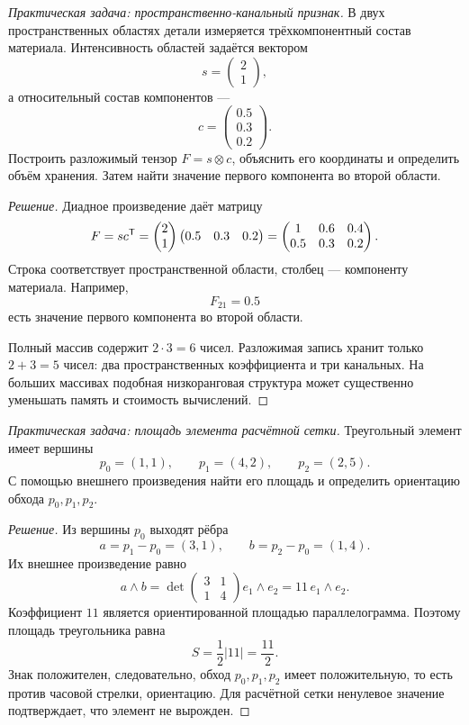 \begin{problem}
\textit{Практическая задача: пространственно-канальный признак.}
В двух пространственных областях детали измеряется трёхкомпонентный состав материала. Интенсивность областей задаётся вектором
\[
s=
\begin{pmatrix}
2\\1
\end{pmatrix},
\]
а относительный состав компонентов ---
\[
c=
\begin{pmatrix}
0.5\\0.3\\0.2
\end{pmatrix}.
\]
Построить разложимый тензор \(F=s\otimes c\), объяснить его координаты и определить объём хранения. Затем найти значение первого компонента во второй области.
\end{problem}

\begin{proof}[Решение]
Диадное произведение даёт матрицу
\[
F=sc^{\mathsf{T}}
=
\begin{pmatrix}
2\\1
\end{pmatrix}
\begin{pmatrix}
0.5&0.3&0.2
\end{pmatrix}
=
\begin{pmatrix}
1&0.6&0.4\\
0.5&0.3&0.2
\end{pmatrix}.
\]
Строка соответствует пространственной области, столбец --- компоненту материала. Например,
\[
F_{21}=0.5
\]
есть значение первого компонента во второй области.

Полный массив содержит \(2\cdot3=6\) чисел. Разложимая запись хранит только \(2+3=5\) чисел: два пространственных коэффициента и три канальных. На больших массивах подобная низкоранговая структура может существенно уменьшать память и стоимость вычислений.
\end{proof}

\begin{problem}
\textit{Практическая задача: площадь элемента расчётной сетки.}
Треугольный элемент имеет вершины
\[
p_0=(1,1),
\qquad
p_1=(4,2),
\qquad
p_2=(2,5).
\]
С помощью внешнего произведения найти его площадь и определить ориентацию обхода \(p_0,p_1,p_2\).
\end{problem}

\begin{proof}[Решение]
Из вершины \(p_0\) выходят рёбра
\[
a=p_1-p_0=(3,1),
\qquad
b=p_2-p_0=(1,4).
\]
Их внешнее произведение равно
\[
a\wedge b
=
\det
\begin{pmatrix}
3&1\\
1&4
\end{pmatrix}
e_1\wedge e_2
=
11\,e_1\wedge e_2.
\]
Коэффициент \(11\) является ориентированной площадью параллелограмма. Поэтому площадь треугольника равна
\[
S=\frac12|11|=\frac{11}{2}.
\]
Знак положителен, следовательно, обход \(p_0,p_1,p_2\) имеет положительную, то есть против часовой стрелки, ориентацию. Для расчётной сетки ненулевое значение подтверждает, что элемент не вырожден.
\end{proof}

